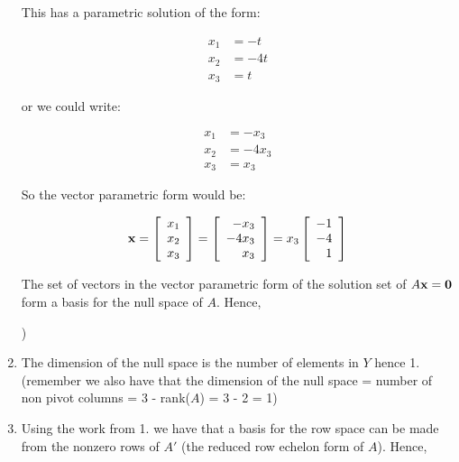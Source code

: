 \documentclass[12pt]{article}
\newcommand*\mybluebox[1]{%
\colorbox{myblue}{\hspace{1em}#1\hspace{1em}}}
\begin{document}
\begin{enumerate}
This has a parametric solution of the form:

\begin{align*}
x_1 &= -t\\
x_2 &= -4t\\
x_3 &= t 
\end{align*}

or we could write:

\begin{align*}
x_1 &= -x_3\\
x_2 &= -4x_3\\
x_3 &= x_3 
\end{align*}

So the vector parametric form would be:

\[ {\bf x} = \left[ \begin{array}{r} x_1 \\ x_2  \\ x_3  \end{array} \right] =  \left[ \begin{array}{r} -x_3 \\ -4x_3  \\ x_3  \end{array} \right] = x_3 \left[ \begin{array}{r} -1 \\ -4  \\ 1  \end{array} \right] \]

The set of vectors in the vector parametric form of the solution set of $A{\bf x}={\bf 0}$ form a basis for the null space of $A$.  Hence,

\begin{empheq}[box=\mybluebox]{align*}
Y =  \left( \left[ \begin{array}{r} -1 \\ -4  \\ 1  \end{array} \right] \right)
\end{empheq}

\item The dimension of the null space is the number of elements in $Y$ hence \colorbox{myblue}{1}.  (remember we also have that the dimension of the null space = number of non pivot columns = 3 - rank($A$) = 3 - 2 = 1)

\item Using the work from 1. we have that a basis for the row space can be made from the nonzero rows of $A'$ (the reduced row echelon form of $A$).  Hence,


\end{enumerate}
\end{document}
